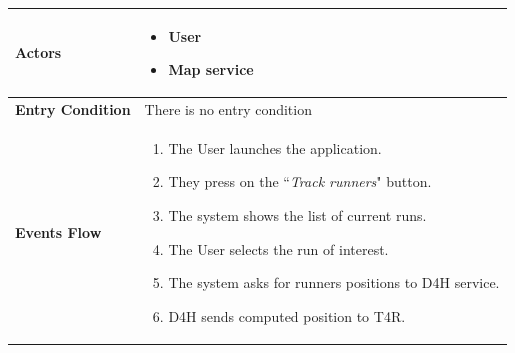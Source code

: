             \begin{table}[H]
            	\centering
                
                \begin{tabular}{|p{3cm}|p{8.2cm}|}
                    \hline
                    \textbf{Actors} & \begin{itemize}
                                            \item User
                                            \item Map service
                                        \end{itemize} \\
                     \hline
                    \textbf{Entry Condition} & There is no entry condition \\
                     \hline
                    \textbf{Events Flow} & \begin{enumerate}
                                                \item The User launches the application.
                                                \item They press on the ``\emph{Track runners}" button.
                                                \item The system shows the list of current runs.
                                                \item The User selects the run of interest.
                                                \item The system asks for runners positions to D4H service.
                                                \item D4H sends computed position to T4R.
                                                

\end{enumerate}
\end{tabular}
\end{table}
